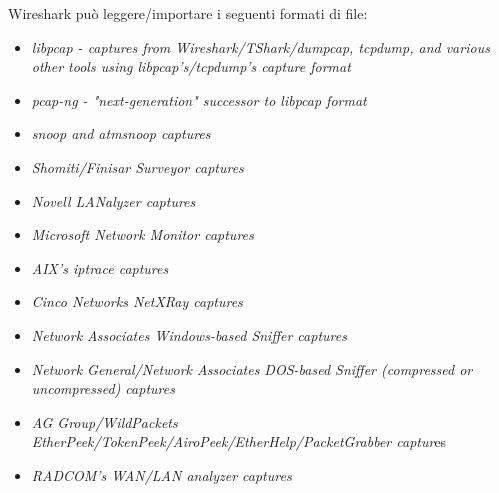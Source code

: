 \documentclass[a4paper,11pt]{book}
\begin{document}
Wireshark può leggere/importare i seguenti formati di file:
\begin{itemize}
\item \textit{libpcap - captures from Wireshark/TShark/dumpcap, tcpdump, and various other tools using libpcap's/tcpdump's capture format}
\item \textit{pcap-ng - "next-generation" successor to libpcap format}
\item \textit{snoop and atmsnoop captures}
\item \textit{Shomiti/Finisar Surveyor captures}
\item \textit{Novell LANalyzer captures}
\item \textit{Microsoft Network Monitor captures}
\item \textit{AIX's iptrace captures}
\item \textit{Cinco Networks NetXRay captures}
\item \textit{Network Associates Windows-based Sniffer captures}
\item \textit{Network General/Network Associates DOS-based Sniffer (compressed or uncompressed) captures}
\item \textit{AG Group/WildPackets EtherPeek/TokenPeek/AiroPeek/EtherHelp/PacketGrabber captur}es
\item \textit{RADCOM's WAN/LAN analyzer captures}


\end{itemize}
\end{document}
